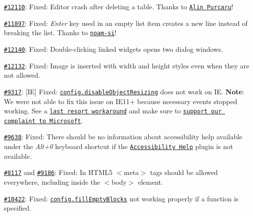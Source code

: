 \begin{DoxyItemize}
\item \href{http://dev.ckeditor.com/ticket/12110}{\tt \#12110}\+: Fixed\+: Editor crash after deleting a table. Thanks to \href{https://github.com/mesmerizero}{\tt Alin Purcaru}!
\item \href{http://dev.ckeditor.com/ticket/11897}{\tt \#11897}\+: Fixed\+: {\itshape Enter} key used in an empty list item creates a new line instead of breaking the list. Thanks to \href{https://github.com/noam-si}{\tt noam-\/si}!
\item \href{http://dev.ckeditor.com/ticket/12140}{\tt \#12140}\+: Fixed\+: Double-\/clicking linked widgets opens two dialog windows.
\item \href{http://dev.ckeditor.com/ticket/12132}{\tt \#12132}\+: Fixed\+: Image is inserted with {\ttfamily width} and {\ttfamily height} styles even when they are not allowed.
\item \href{http://dev.ckeditor.com/ticket/9317}{\tt \#9317}\+: \mbox{[}IE\mbox{]} Fixed\+: \href{http://docs.ckeditor.com/#!/api/CKEDITOR.config-cfg-disableObjectResizing}{\tt {\ttfamily config.\+disable\+Object\+Resizing}} does not work on IE. {\bfseries Note}\+: We were not able to fix this issue on I\+E11+ because necessary events stopped working. See a \href{http://dev.ckeditor.com/ticket/9317#comment:16}{\tt last resort workaround} and make sure to \href{https://connect.microsoft.com/IE/feedback/details/742593/please-respect-execcommand-enableobjectresizing-in-contenteditable-elements}{\tt support our complaint to Microsoft}.
\item \href{http://dev.ckeditor.com/ticket/9638}{\tt \#9638}\+: Fixed\+: There should be no information about accessibility help available under the {\itshape Alt+0} keyboard shortcut if the \href{http://ckeditor.com/addon/a11yhelp}{\tt Accessibility Help} plugin is not available.
\item \href{http://dev.ckeditor.com/ticket/8117}{\tt \#8117} and \href{http://dev.ckeditor.com/ticket/9186}{\tt \#9186}\+: Fixed\+: In H\+T\+M\+L5 {\ttfamily $<$meta$>$} tags should be allowed everywhere, including inside the {\ttfamily $<$body$>$} element.
\item \href{http://dev.ckeditor.com/ticket/10422}{\tt \#10422}\+: Fixed\+: \href{http://docs.ckeditor.com/#!/api/CKEDITOR.config-cfg-fillEmptyBlocks}{\tt {\ttfamily config.\+fill\+Empty\+Blocks}} not working properly if a function is specified.
\end{DoxyItemize}

